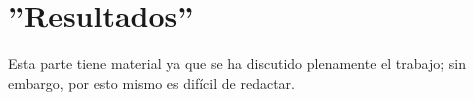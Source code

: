 \chapter{''Resultados''}

Esta parte tiene material ya que se ha discutido plenamente el trabajo; sin embargo, por esto
mismo es dif\'icil de redactar.

